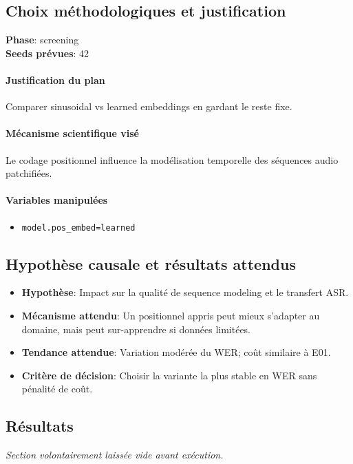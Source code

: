 \documentclass[11pt,a4paper]{article}
\begin{document}
\subsection{Choix méthodologiques et justification}
\textbf{Phase}: screening\\
\textbf{Seeds prévues}: 42\\


\paragraph{Justification du plan}
Comparer sinusoidal vs learned embeddings en gardant le reste fixe.

\paragraph{Mécanisme scientifique visé}
Le codage positionnel influence la modélisation temporelle des séquences audio patchifiées.

\paragraph{Variables manipulées}
\begin{itemize}
\item \texttt{model.pos\_embed=learned}
\end{itemize}

\subsection{Hypothèse causale et résultats attendus}
\begin{itemize}[leftmargin=1.2cm]
\item \textbf{Hypothèse}: Impact sur la qualité de sequence modeling et le transfert ASR.
\item \textbf{Mécanisme attendu}: Un positionnel appris peut mieux s'adapter au domaine, mais peut sur-apprendre si données limitées.
\item \textbf{Tendance attendue}: Variation modérée du WER; coût similaire à E01.
\item \textbf{Critère de décision}: Choisir la variante la plus stable en WER sans pénalité de coût.
\end{itemize}

\subsection{Résultats}
\textit{Section volontairement laissée vide avant exécution.}
\end{document}
